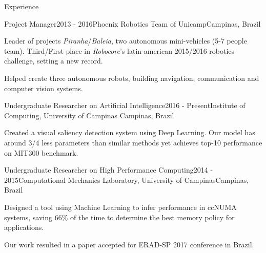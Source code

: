 \documentclass[8pt]{resume}
\newcommand{\tit}[1]{\textit{#1}}
\begin{document}
\begin{rSection}{Experience}

\begin{rSubsection}{Project Manager}{2013 - 2016}{Phoenix Robotics Team of Unicamp}{Campinas, Brazil}
\item Leader of projects \tit{Piranha}/\tit{Baleia},
        two autonomous mini-vehicles (5-7 people team).
        Third/First place in \tit{Robocore}'s latin-american 2015/2016 robotics
        challenge, setting a new record.
    \item Helped create three autonomous robots, building navigation,
        communication and computer vision systems.
\end{rSubsection}

\begin{rSubsection}{Undergraduate Researcher on Artificial Intelligence}{2016 - Present}{Institute of Computing, University of Campinas}
    {Campinas, Brazil}
    \item Created a visual saliency detection system using Deep Learning.
        Our model has around 3/4 less parameters than similar methods yet
        achieves top-10 performance on MIT300 benchmark.
\end{rSubsection}

\begin{rSubsection}{Undergraduate Researcher on High Performance Computing}{2014 - 2015}{Computational Mechanics Laboratory, University of Campinas}{Campinas, Brazil}
    \item Designed a tool using Machine Learning to infer performance
        in ccNUMA systems, saving $66\%$ of the time to
        determine the best memory policy for applications.
    \item Our work resulted in a paper accepted for ERAD-SP 2017 conference in Brazil.
\end{rSubsection}


\end{rSection}
\end{document}
